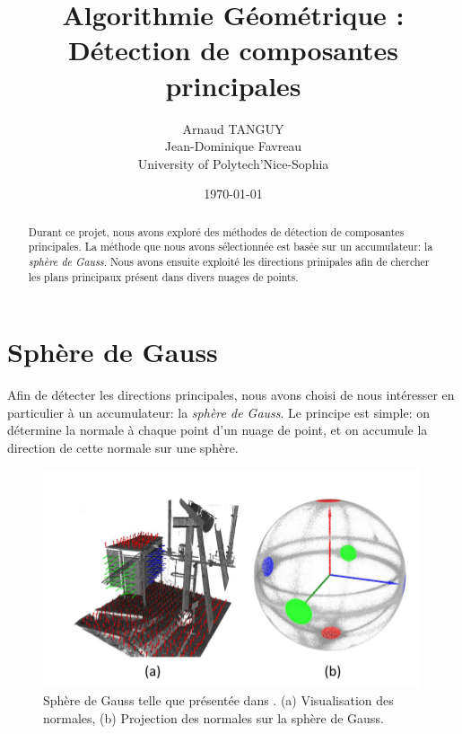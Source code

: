 \documentclass{article}
\begin{document}
\author{Arnaud TANGUY\\
			Jean-Dominique Favreau\\
  University of Polytech'Nice-Sophia}
\date{\today}
\title{Algorithmie Géométrique : Détection de composantes principales}
\maketitle
\begin{abstract}
	Durant ce projet, nous avons exploré des méthodes de détection de composantes principales. La méthode que nous avons sélectionnée est basée sur un accumulateur: la \emph{sphère de Gauss}. Nous avons ensuite exploité les directions prinipales afin de chercher les plans principaux présent dans divers nuages de points.
\end{abstract}

\bigskip

\tableofcontents

\newpage


\section{Sphère de Gauss}
Afin de détecter les directions principales, nous avons choisi de nous intéresser en particulier à un accumulateur: la \emph{sphère de Gauss}.
Le principe est simple: on détermine la normale à chaque point d'un nuage de point, et on accumule la direction de cette normale sur une sphère.

\begin{figure}[H]
    \begin{center}
        \includegraphics[width=.9\linewidth]{gauss_sphere.png}
    \end{center}
    \caption{Sphère de Gauss telle que présentée dans \protect\citep{Gauss}. (a) Visualisation des normales, (b) Projection des normales sur la sphère de Gauss.}
    \label{fig:gauss_sphere_3D}
\end{figure}
\end{document}
